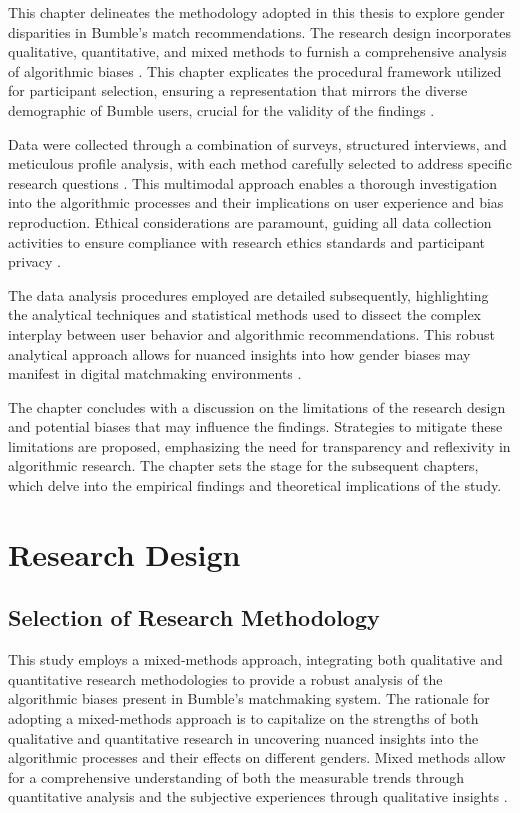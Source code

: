This chapter delineates the methodology adopted in this thesis to explore gender disparities in Bumble’s match recommendations. The research design incorporates qualitative, quantitative, and mixed methods to furnish a comprehensive analysis of algorithmic biases \cite{Kalra_Gupta_Varghese_Rangaswamy_2023}. This chapter explicates the procedural framework utilized for participant selection, ensuring a representation that mirrors the diverse demographic of Bumble users, crucial for the validity of the findings \cite{Mislove_Viswanath_Gummadi_Druschel_2010}.

Data were collected through a combination of surveys, structured interviews, and meticulous profile analysis, with each method carefully selected to address specific research questions \cite{Kalra_Gupta_Varghese_Rangaswamy_2023}. This multimodal approach enables a thorough investigation into the algorithmic processes and their implications on user experience and bias reproduction. Ethical considerations are paramount, guiding all data collection activities to ensure compliance with research ethics standards and participant privacy \cite{Elovici_Fire_Herzberg_Shulman_2014}.

The data analysis procedures employed are detailed subsequently, highlighting the analytical techniques and statistical methods used to dissect the complex interplay between user behavior and algorithmic recommendations. This robust analytical approach allows for nuanced insights into how gender biases may manifest in digital matchmaking environments \cite{Raghavan_Barocas_Kleinberg_Levy_2019}.

The chapter concludes with a discussion on the limitations of the research design and potential biases that may influence the findings. Strategies to mitigate these limitations are proposed, emphasizing the need for transparency and reflexivity in algorithmic research. The chapter sets the stage for the subsequent chapters, which delve into the empirical findings and theoretical implications of the study.

\section{Research Design}
\subsection{Selection of Research Methodology}
This study employs a mixed-methods approach, integrating both qualitative and quantitative research methodologies to provide a robust analysis of the algorithmic biases present in Bumble's matchmaking system. The rationale for adopting a mixed-methods approach is to capitalize on the strengths of both qualitative and quantitative research in uncovering nuanced insights into the algorithmic processes and their effects on different genders. Mixed methods allow for a comprehensive understanding of both the measurable trends through quantitative analysis and the subjective experiences through qualitative insights \cite{Kalra_Gupta_Varghese_Rangaswamy_2023}. 

